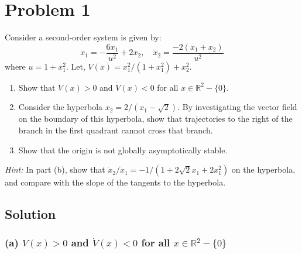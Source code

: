 \section*{Problem 1}

Consider a second-order system is given by:
\begin{equation*}
    \dot{x}_{1}=-\frac{6 x_{1}}{u^{2}}+2 x_{2}, \quad \dot{x}_{2}=\frac{-2\left(x_{1}+x_{2}\right)}{u^{2}}
\end{equation*}
where \( u=1+x_{1}^{2} \). Let, \( V(x)=x_{1}^{2} /\left(1+x_{1}^{2}\right)+x_{2}^{2} \).
\begin{enumerate}[label= (\alph*)]
    \item Show that \( V(x)>0 \) and \( \dot{V}(x)<0 \) for all \( x \in \mathbb{R}^{2}-\{0\} \).
    \item Consider the hyperbola \( x_{2}=2 /\left(x_{1}-\sqrt{2}\right) \).
          By investigating the vector field on the boundary of this hyperbola, show that trajectories to the right of the branch in the first quadrant cannot cross that branch.
    \item Show that the origin is not globally asymptotically stable.
\end{enumerate}
\textit{Hint:} In part (b), show that \( \dot{x}_{2} / \dot{x}_{1}=-1 /\left(1+2 \sqrt{2} x_{1}+2 x_{1}^{2}\right) \) on the hyperbola, and compare with the slope of the tangents to the hyperbola.

\subsection*{Solution}

\subsubsection*{(a) \( V(x) > 0 \) and \( \dot{V}(x) < 0 \) for all \( x \in \mathbb{R}^2 - \{ 0 \} \)}

